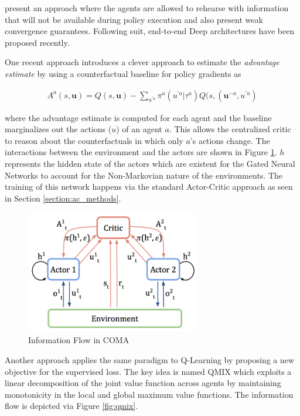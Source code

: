 \documentclass[12pt,a4paper]{article}
\begin{document}
\cite{kraemer2016multi} present an approach where the agents are allowed to rehearse with
information that will not be available during policy execution and also present weak convergence
guarantees. Following suit, end-to-end Deep architectures have been proposed recently.

One recent approach introduces a clever approach to estimate the \textit{advantage estimate}
by using a counterfactual baseline for policy gradients \cite{foerster2017counterfactual} as

\begin{align}
A^a(s, \mathbf{u}) = Q(s, \mathbf{u}) - \sum_{u^{\prime a}} \pi^a(u^{\prime a} | \tau^a) Q(s,(\mathbf{u}^{-a}, u^{\prime a})
\end{align}

where the advantage estimate is computed for each agent and the baseline marginalizes out
the actions ($u$) of an agent $a$. This allows the centralized critic to reason about the
counterfactuals in which only $a$'s actions change. The interactions between the environment
and the actors are shown in Figure \ref{fig:coma}. $h$ represents the hidden state of the actors
which are existent for the Gated Neural Networks to account for the Non-Markovian nature
of the environments. The training of this network happens via the standard Actor-Critic
approach as seen in Section \ref{section:ac_methods}.

\begin{figure}[ht]
\centering
\includegraphics[width=3in]{coma-arch}
\caption{Information Flow in COMA \cite{foerster2017counterfactual}} \label{fig:coma}
\end{figure}

Another approach applies the same paradigm to Q-Learning by proposing a new objective for
the supervised loss. The key idea is named QMIX \cite{2018arXiv180311485R} which
exploits a linear decomposition of the joint value function across agents by maintaining
monotonicity in the local and global maximum value functions. The information flow is
depicted via Figure \ref{fig:qmix}.
\end{document}
